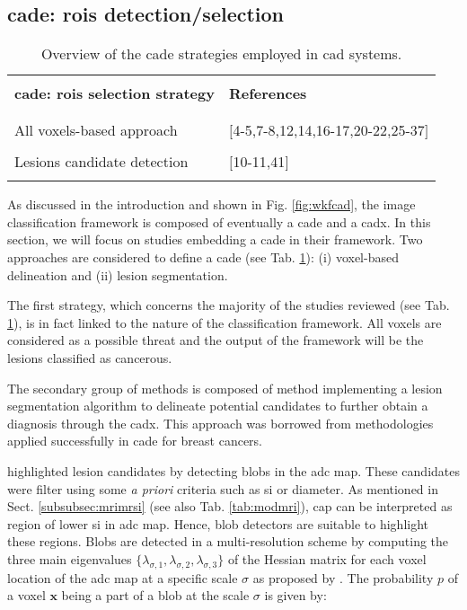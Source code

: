 \subsection{\ac{cade}: \acp{roi} detection/selection}

\begin{table}
	\caption{Overview of the \ac{cade} strategies employed in \ac{cad} systems.}
	\small
	\begin{tabular}{p{.65\linewidth} p{.25\linewidth}}
		\hline \\ [-1.5ex]
		\textbf{\ac{cade}: \acp{roi} selection strategy} & \textbf{References} \\ \\ [-1.5ex]
		\hline \\ [-1.5ex]
		\quad All voxels-based approach & $[$4-5,7-8,12,14,16-17,20-22,25-37$]$ \\ \\ [-1.5ex]
		\quad Lesions candidate detection & $[$10-11,41$]$ \\ \\ [-1.5ex]
		\hline
	\end{tabular}
	\label{tab:cade}
\end{table}

As discussed in the introduction and shown in Fig. \ref{fig:wkfcad}, the image classification framework is composed of eventually a \ac{cade} and a \ac{cadx}. In this section, we will focus on studies embedding a \ac{cade} in their framework. Two approaches are considered to define a \ac{cade} (see Tab. \ref{tab:cade}): (i) voxel-based delineation and (ii) lesion segmentation.

The first strategy, which concerns the majority of the studies reviewed (see Tab. \ref{tab:cade}), is in fact linked to the nature of the classification framework. All voxels are considered as a possible threat and the output of the framework will be the lesions classified as cancerous.

The secondary group of methods is composed of method implementing a lesion segmentation algorithm to delineate potential candidates to further obtain a diagnosis through the \ac{cadx}. This approach was borrowed from methodologies applied successfully in \ac{cade} for breast cancers.

\cite{Vos2012} highlighted lesion candidates by detecting blobs in the \ac{adc} map. These candidates were filter using some \textit{a priori} criteria such as \ac{si} or diameter. As mentioned in Sect. \ref{subsubsec:mrimrsi} (see also Tab. \ref{tab:modmri}), \ac{cap} can be interpreted as region of lower \ac{si} in \ac{adc} map. Hence, blob detectors are suitable to highlight these regions. Blobs are detected in a multi-resolution scheme by computing the three main eigenvalues $\{ \lambda_{\sigma,1},\lambda_{\sigma,2},\lambda_{\sigma,3} \}$ of the Hessian matrix for each voxel location of the \ac{adc} map at a specific scale $\sigma$ as proposed by \cite{Li2003}. The probability $p$ of a voxel $\mathbf{x}$ being a part of a blob at the scale $\sigma$ is given by:


